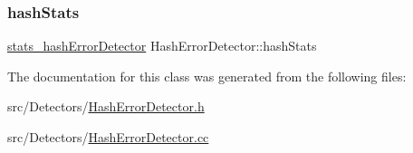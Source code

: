 \subsubsection{\texorpdfstring{hash\+Stats}{hashStats}}
{\footnotesize\ttfamily \hyperlink{_hash_error_detector_8h_afcf148bcfe372c25deda29220815b9e0}{stats\+\_\+hash\+Error\+Detector} Hash\+Error\+Detector\+::hash\+Stats\hspace{0.3cm}{\ttfamily [private]}}



The documentation for this class was generated from the following files\+:\begin{DoxyCompactItemize}
\item 
src/\+Detectors/\hyperlink{_hash_error_detector_8h}{Hash\+Error\+Detector.\+h}\item 
src/\+Detectors/\hyperlink{_hash_error_detector_8cc}{Hash\+Error\+Detector.\+cc}\end{DoxyCompactItemize}
